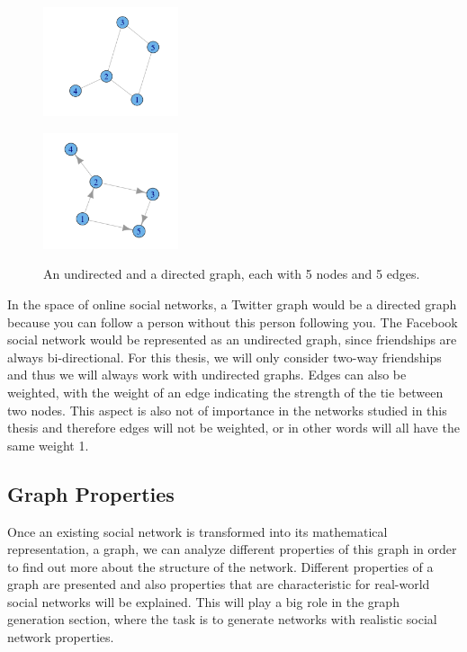 \begin{figure}[!ht]
\centering
\begin{minipage}[b]{5 cm}
\includegraphics[width=150px]{./2-recommendersystemssocialnetworks/figures/SampleGraph.png}
\label{f:simplegraph}
\end{minipage}
\begin{minipage}[b]{5 cm}
\includegraphics[width=150px]{./2-recommendersystemssocialnetworks/figures/SampleGraph2.png}
\label{f:simplegraph}
\end{minipage}
\caption[An undirected and a directed graph, each with 5 nodes and 5 edges.]
{An undirected and a directed graph, each with 5 nodes and 5 edges.}
\end{figure}

In the space of online social networks, a Twitter graph would be a directed graph because you can follow a person without this person following you. The Facebook social network would be represented as an undirected graph, since friendships are always bi-directional. For this thesis, we will only consider two-way friendships and thus we will always work with undirected graphs. Edges can also be weighted, with the weight of an edge indicating the strength of the tie between two nodes. This aspect is also not of importance in the networks studied in this thesis and therefore edges will not be weighted, or in other words will all have the same weight 1.

\subsection{Graph Properties}
\label{sst:graphproperties} Once an existing social network is transformed into its mathematical representation, a graph, we can analyze different properties of this graph in order to find out more about the structure of the network. Different properties of a graph are presented and also properties that are characteristic for real-world social networks will be explained. This will play a big role in the graph generation section, where the task is to generate networks with realistic social network properties.

